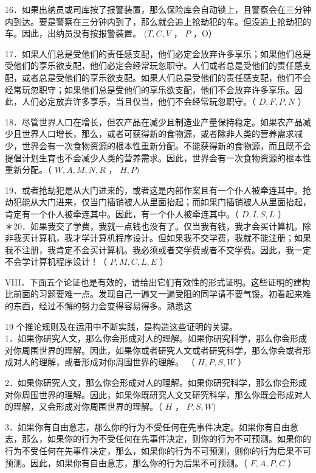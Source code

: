 16．如果出纳员或司库按了报警装置，那么保险库会自动锁上，且警察会在三分钟内到达。要是警察在三分钟内到了，那么就会追上抢劫犯的车。但没追上抢劫犯的车。因此，出纳员没有按报警装置。 $(T, C, V$ ， $P$ ，O）

17．如果人们总是受他们的责任感支配，他们必定会放弃许多享乐；如果他们总是受他们的享乐欲支配，他们必定会经常玩忽职守。人们或者总是受他们的责任感支配，或者总是受他们的享乐欲支配。如果人们总是受他们的责任感支配，他们不会经常玩忽职守；如果他们总是受他们的享乐欲支配，他们不会放弃许多享乐。因此，人们必定放弃许多享乐，当且仅当，他们不会经常玩忽职守。（ $D, F, P, N$ ）

18．尽管世界人口在增长，但农产品在减少且制造业产量保持稳定。如果农产品减少且世界人口增长，那么，或者可获得新的食物源，或者除非人类的营养需求减少，世界会有一次食物资源的根本性重新分配。不能获得新的食物源，而且既不会提倡计划生育也不会减少人类的营养需求。因此，世界会有一次食物资源的根本性重新分配。（ $W, A, M, N, R$ ， $H, P)$

19．或者抢劫犯是从大门进来的，或者这是内部作案且有一个仆人被牵连其中。抢劫犯能从大门进来，仅当门插销被人从里面抬起；而如果门插销被人从里面抬起，肯定有一个仆人被牵连其中。因此，有一个仆人被牵连其中。（ $D, I, S, L$ ）\\
＊20．如果我交了学费，我就一点钱也没有了。仅当我有钱，我才会买计算机。除非我买计算机，我才学计算机程序设计。但如果我不交学费，我就不能注册；如果我不注册，我肯定不会买计算机。我必须或者交学费或者不交学费。因此，我一定不会学计算机程序设计！（ $P, M, C, L, E$ ）

VIII．下面五个论证也是有效的，请给出它们有效性的形式证明。这些证明的建构比前面的习题要难一点。发现自己一遍又一遍受阻的同学请不要气馁。初看起来难的东西，经过不懈的努力会变得容易得多。熟悉这

19 个推论规则及在运用中不断实践，是构造这些证明的关键。\\
1．如果你研究人文，那么你会形成对人的理解。如果你研究科学，那么你会形成对你周围世界的理解。因此，如果你或者研究人文或者研究科学，那么你会或者形成对人的理解，或者形成对你周围世界的理解。 （ $H, P, S, W$ ）

2．如果你研究人文，那么你会形成对人的理解。如果你研究科学，那么你会形成对你周围世界的理解。因此，如果你既研究人文又研究科学，那么你既会形成对人的理解，又会形成对你周围世界的理解。（ $H$ ， $P, S, W)$

3．如果你有自由意志，那么你的行为不受任何在先事件决定。如果你有自由意志，那么，如果你的行为不受任何在先事件决定，则你的行为不可预测。如果你的行为不受任何在先事件决定，那么，如果你的行为不可预测，则你的行为后果不可预测。因此，如果你有自由意志，那么你的行为后果不可预测。（ $F, A, P, C$ ）

